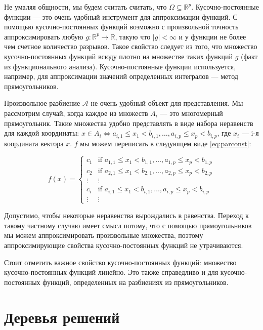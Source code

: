 \documentclass[12pt,a4paper]{article}
\begin{document}
Не умаляя общности, мы будем считать считать, что $\Omega \subseteq \mathbb R^p$. Кусочно-постоянные функции --- это очень удобный инструмент для аппроксимации функций. С помощью кусочно-постоянных функций возможно с произвольной точность аппроксимировать любую $g: \mathbb R^p \rightarrow \mathbb R$, такую что $|g| < \infty$ и у функции не более чем счетное количество разрывов. Такое свойство следует из того, что множество кусочно-постоянных функций всюду плотно на множестве таких функций $g$ (факт из функционального анализа). Кусочно-постоянные функции используется, например, для аппроксимации значений определенных интегралов ---  метод прямоугольников.\par

Произвольное разбиение $\mathcal A$ не очень удобный объект для представления. Мы рассмотрим случай, когда каждое из множеств $A_i$ --- это многомерный прямоугольник. Такие множества удобно представлять в виде набора неравенств для каждой координаты: $x \in A_i \iff a_{i,1} \leq x_1 < b_{i, 1}, \ldots, a_{i,p} \leq x_p < b_{i,p}$, где $x_i$ --- i-я координата вектора $x$. $f$ мы можем переписать в следующем виде \eqref{eq:parconst}:

\begin{equation}
f(x) = 
\begin{cases}
c_1 & \mbox{if }  a_{1,1} \leq x_1 < b_{1, 1}, \ldots, a_{1,p} \leq x_p < b_{1,p} \\
c_2 & \mbox{if }  a_{2,1} \leq x_1 < b_{2, 1}, \ldots, a_{2,p} \leq x_p < b_{2,p} \\
\vdots & \vdots \\
c_i & \mbox{if }  a_{i,1} \leq x_1 < b_{i, 1}, \ldots, a_{i,p} \leq x_p < b_{i,p} \\
\vdots & \vdots
\end{cases}
\label{eq:parconst}
\end{equation}

Допустимо, чтобы некоторые неравенства вырождались в равенства. Переход к такому частному случаю имеет смысл потому, что с помощью прямоугольников мы можем аппроксимировать произвольные множества, поэтому аппроксимирующие свойства кусочно-постоянных функций не утрачиваются.\par

Стоит отметить важное свойство кусочно-постоянных функций: множество кусочно-постоянных функций линейно. Это также справедливо и для кусочно-постоянных функций, определенных на разбиениях из прямоугольников.

\section{Деревья решений}
\end{document}
